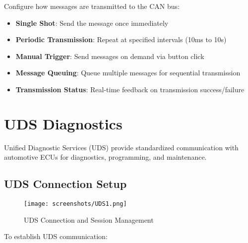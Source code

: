 \documentclass[11pt,a4paper]{article}
\begin{document}
Configure how messages are transmitted to the CAN bus:

\begin{itemize}
    \item \textbf{Single Shot}: Send the message once immediately
    \item \textbf{Periodic Transmission}: Repeat at specified intervals (10ms to 10s)
    \item \textbf{Manual Trigger}: Send messages on demand via button click
    \item \textbf{Message Queuing}: Queue multiple messages for sequential transmission
    \item \textbf{Transmission Status}: Real-time feedback on transmission success/failure
\end{itemize}

\section{UDS Diagnostics}

Unified Diagnostic Services (UDS) provide standardized communication with automotive ECUs for diagnostics, programming, and maintenance.

\subsection{UDS Connection Setup}

\begin{figure}[H]
    \centering
    \texttt{[image: screenshots/UDS1.png]}
    \caption{UDS Connection and Session Management}
    \label{fig:uds1}
\end{figure}

To establish UDS communication:
\end{document}
